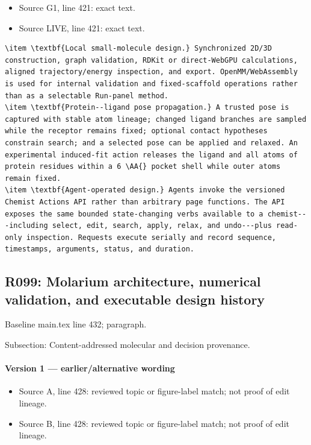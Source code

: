 \documentclass[11pt]{article}
\begin{document}
\begin{itemize}[leftmargin=*]
\item Source G1, line 421: exact text.
\item Source LIVE, line 421: exact text.
\end{itemize}

\begin{lstlisting}
\item \textbf{Local small-molecule design.} Synchronized 2D/3D construction, graph validation, RDKit or direct-WebGPU calculations, aligned trajectory/energy inspection, and export. OpenMM/WebAssembly is used for internal validation and fixed-scaffold operations rather than as a selectable Run-panel method.
\item \textbf{Protein--ligand pose propagation.} A trusted pose is captured with stable atom lineage; changed ligand branches are sampled while the receptor remains fixed; optional contact hypotheses constrain search; and a selected pose can be applied and relaxed. An experimental induced-fit action releases the ligand and all atoms of protein residues within a 6 \AA{} pocket shell while outer atoms remain fixed.
\item \textbf{Agent-operated design.} Agents invoke the versioned Chemist Actions API rather than arbitrary page functions. The API exposes the same bounded state-changing verbs available to a chemist---including select, edit, search, apply, relax, and undo---plus read-only inspection. Requests execute serially and record sequence, timestamps, arguments, status, and duration.
\end{lstlisting}

\subsection{R099: Molarium architecture, numerical validation, and executable design history}

Baseline main.tex line 432; paragraph.

Subsection: Content-addressed molecular and decision provenance.

\paragraph{Version 1 --- earlier/alternative wording}

\begin{itemize}[leftmargin=*]
\item Source A, line 428: reviewed topic or figure-label match; not proof of edit lineage.
\item Source B, line 428: reviewed topic or figure-label match; not proof of edit lineage.
\end{itemize}
\end{document}
